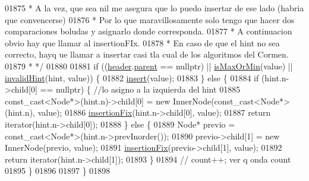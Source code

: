 \begin{DoxyCode}
01875 \textcolor{comment}{            * A la vez, que sea nil me asegura que lo puedo insertar de ese lado (habria que convencerse)}
01876 \textcolor{comment}{            * Por lo que maravillosamente solo tengo que hacer dos comparaciones boludas y asignarlo donde
       corresponda.}
01877 \textcolor{comment}{            * A continuacion obvio hay que llamar al insertionFIx.}
01878 \textcolor{comment}{            * En caso de que el hint no sea correcto, hayq ue llamar a insertar casi tla cual de los
       algoritmos del Cormen.}
01879 \textcolor{comment}{            * */}
01880 
01881             \textcolor{keywordflow}{if} ((\hyperlink{classaed2_1_1map_a92d93f905c8ad73fba18fdc7e8915cce_a92d93f905c8ad73fba18fdc7e8915cce}{header}.\hyperlink{structaed2_1_1map_1_1Node_ab6a5f9e471b311755e4a56834086cb90_ab6a5f9e471b311755e4a56834086cb90}{parent} == \textcolor{keyword}{nullptr}) || \hyperlink{classaed2_1_1map_a81db4ead6daafe94938d5410173bdb6c_a81db4ead6daafe94938d5410173bdb6c}{isMaxOrMin}(value) || 
      \hyperlink{classaed2_1_1map_a7403745a296985d64b8666c18953b2c0_a7403745a296985d64b8666c18953b2c0}{invalidHint}(hint, value)) \{
01882                 \hyperlink{classaed2_1_1map_a6941cde9a79c27f054b5c97a587a1854_a6941cde9a79c27f054b5c97a587a1854}{insert}(value);
01883             \} \textcolor{keywordflow}{else} \{
01884                 \textcolor{keywordflow}{if} (hint.n->child[0] == \textcolor{keyword}{nullptr}) \{ \textcolor{comment}{//lo asigno a la izquierda del hint}
01885                     \textcolor{keyword}{const\_cast<}Node*\textcolor{keyword}{>}(hint.n)->child[0] = \textcolor{keyword}{new} InnerNode(const\_cast<Node*>(hint.n), value);
01886                     \hyperlink{classaed2_1_1map_abe3f47a745e17a6327943b813ff6bfb3_abe3f47a745e17a6327943b813ff6bfb3}{insertionFix}(hint.n->child[0], value);
01887                     \textcolor{keywordflow}{return} iterator(hint.n->child[0]);
01888                 \} \textcolor{keywordflow}{else} \{
01889                     Node* previo =  \textcolor{keyword}{const\_cast<}Node*\textcolor{keyword}{>}(hint.n->prevInorder());
01890                     previo->child[1] = \textcolor{keyword}{new} InnerNode(previo, value);
01891                     \hyperlink{classaed2_1_1map_abe3f47a745e17a6327943b813ff6bfb3_abe3f47a745e17a6327943b813ff6bfb3}{insertionFix}(previo->child[1], value);
01892                     \textcolor{keywordflow}{return} iterator(hint.n->child[1]);
01893                 \}
01894                 \textcolor{comment}{// count++; ver q onda count}
01895             \}
01896 
01897         \}
01898 

\end{DoxyCode}
